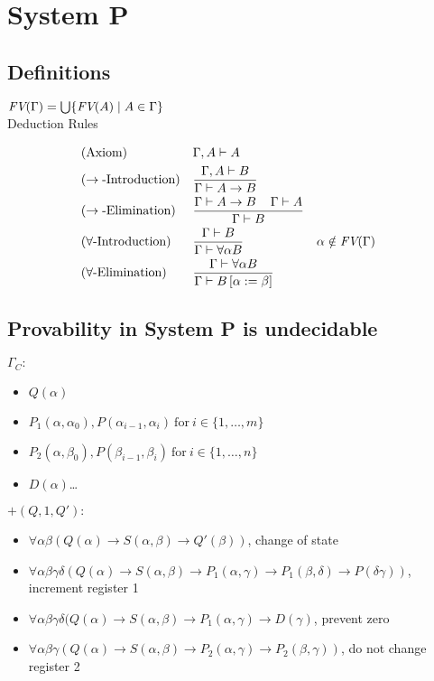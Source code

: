 \section{System P}
\subsection{Definitions}
$\emph{FV}(\Gamma)=\bigcup\{\emph{FV}(A)\mid A\in \Gamma\}$\\
Deduction Rules
\begin{mdframed}
\begingroup
\addtolength{\jot}{0.3cm}
\begin{align*}
&(\text{Axiom}) &&\Gamma,A\vdash A\\
&(\rightarrow\text{-Introduction}) &&\frac{\Gamma,A\vdash B}{\Gamma\vdash A\to B}\\
&(\rightarrow\text{-Elimination}) &&\frac{\Gamma\vdash A\to B \hspace{0.4cm}\Gamma\vdash A}{\Gamma\vdash B}\\
&(\forall\text{-Introduction}) &&\frac{\Gamma\vdash B}{\Gamma\vdash \forall\alpha B} &&\alpha\notin\emph{FV}(\Gamma) \\
&(\forall\text{-Elimination}) &&\frac{\Gamma\vdash \forall\alpha B }{\Gamma\vdash B\left[ \alpha:=\beta\right] } %
\end{align*}
\endgroup
\end{mdframed}
\subsection{Provability in System P is undecidable}
$\Gamma_C:$
\begin{itemize}
\item $Q(\alpha)$
\item $P_1(\alpha,\alpha_0),P(\alpha_{i-1},\alpha_i)~\text{for}~i\in\{1,\dots,m\}$
\item $P_2(\alpha,\beta_0),P(\beta_{i-1},\beta_i)~\text{for}~i\in\{1,\dots,n\}$
\item $D(\alpha)$\dots
\end{itemize}

$+(Q,1,Q'):$
\begin{itemize}
\item $\forall\alpha\beta(Q(\alpha)\to S(\alpha,\beta)\to Q'(\beta))$, change of state
\item $\forall\alpha\beta\gamma\delta(Q(\alpha)\to S(\alpha,\beta)\to P_1(\alpha,\gamma)\to P_1(\beta,\delta)\to P(\delta\gamma))$, increment register 1
\item $\forall\alpha\beta\gamma\delta(Q(\alpha)\to S(\alpha,\beta)\to P_1(\alpha,\gamma)\to D(\gamma)$, prevent zero %
\item $\forall\alpha\beta\gamma(Q(\alpha)\to S(\alpha,\beta)\to P_2(\alpha,\gamma)\to P_2(\beta,\gamma))$, do not change register 2
\end{itemize}


